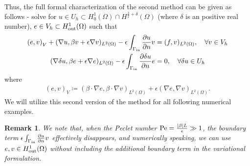 \documentclass[final,leqno]{siamltex}
\newcommand{\LRp}[1]{\left( #1 \right)}
\newcommand{\LRc}[1]{\left\{ #1 \right\}}
\newcommand{\LRb}[1]{\left| #1 \right|}
\newcommand{\Grad} {\ensuremath{\nabla}}
\renewcommand{\L}{L^2\LRp{\Omega}}
\newcommand{\pd}[2]{\frac{\partial#1}{\partial#2}}
\newtheorem{remark}{Remark}
\begin{document}
Thus, the full formal characterization of the second method can be given as follows - solve for $u\in U_h \subset H^1_0(\Omega)\cap H^{\frac{3}{2}+\delta}(\Omega)$ (where $\delta$ is an positive real number), $e\in V_h\subset H^1_{\rm out}(\Omega)$ such that
\begin{align*}
\LRp{e,v}_V + (\Grad u, \beta v + \epsilon \Grad v)_{\L} - \epsilon\int_{\Gamma_{\rm in}} \pd{u}{n}v &= (f,v)_{\L}, \quad \forall v \in V_h\\
(\Grad \delta u, \beta e + \epsilon \Grad e)_{\L} - \epsilon\int_{\Gamma_{\rm in}} \pd{\delta u}{n}e &= 0, \quad \forall \delta u \in U_h
\end{align*}
where
\begin{align*}
\LRp{e,v}_V \coloneqq \LRp{\beta\cdot \Grad e,\beta\cdot \Grad v}_{\L} + \epsilon \LRp{\Grad e,\Grad v}_{\L}.
\end{align*}
We will utilize this second version of the method for all following numerical examples.  


\begin{remark}
We note that, when the Peclet number ${\rm Pe} = \frac{\LRb{\beta} L}{\epsilon} \gg 1$, the boundary term $\epsilon\int_{\Gamma_{\rm in}} \pd{u}{n}v$ effectively disappears, and numerically speaking, we can use $e,v\in H^1_{\rm out}(\Omega)$ without including the additional boundary term in the variational formulation.  
\end{remark}
\end{document}
